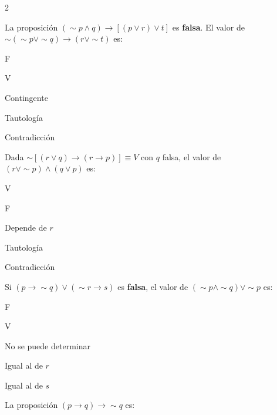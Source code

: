 	\begin{multicols}{2}
		
		\ejercicio La proposición $(\sim p \wedge q) \to [(p \vee r) \vee t]$ es
		\textbf{falsa}. El valor de $\sim(\sim p \vee \sim q) \to (r \vee \sim t)$ es:
		
		\begin{alternativas}
			\item F
			\item V
			\item Contingente
			\item Tautología
			\item Contradicción
		\end{alternativas}
		\vspace{0.3cm}
		
		\ejercicio Dada $\sim[(r \vee q) \to (r \to p)] \equiv V$ con $q$ falsa,
		el valor de $(r \vee \sim p) \wedge (q \vee p)$ es:
		
		\begin{alternativas}
			\item V
			\item F
			\item Depende de $r$
			\item Tautología
			\item Contradicción
		\end{alternativas}
		\vspace{0.3cm}
		
		\ejercicio Si $(p \to \sim q) \vee (\sim r \to s)$ es \textbf{falsa},
		el valor de $(\sim p \wedge \sim q) \vee \sim p$ es:
		
		\begin{alternativas}
			\item F
			\item V
			\item No se puede determinar
			\item Igual al de $r$
			\item Igual al de $s$
		\end{alternativas}
		\vspace{0.3cm}
		
		\ejercicio La proposición $(p \to q) \to \sim q$ es:
		

\end{multicols}
